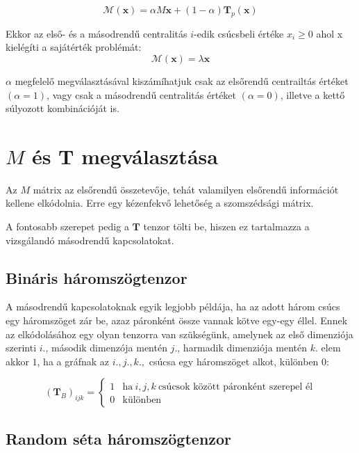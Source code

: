 \documentclass[12pt,numbers=noenddot]{report}
\begin{document}
$$\mathcal{M}(\boldsymbol{x}) = \alpha M \boldsymbol{x} + (1-\alpha) 
\boldsymbol{T}_p(\boldsymbol{x})$$

\noindent
Ekkor az első- és a másodrendű centralitás $i$-edik csúcsbeli értéke $x_i 
\geq 0$ ahol x kielégíti a sajátérték problémát:
$$\mathcal{M}(\boldsymbol{x}) = \lambda \boldsymbol{x}$$

\noindent
$\alpha$ megfelelő megválasztásával kiszámíhatjuk csak az elsőrendű 
centrailtás értéket $(\alpha = 1)$, vagy csak a másodrendű centralitás 
értéket $(\alpha = 0)$, illetve a kettő súlyozott kombinációját is.


\section{$M$ és $\boldsymbol{T}$ megválasztása}

Az $M$ mátrix az elsőrendű összetevője, tehát valamilyen elsőrendű 
információt kellene elkódolnia. 
Erre egy kézenfekvő lehetőség a szomszédsági mátrix.

A fontosabb szerepet pedig a $\boldsymbol{T}$ tenzor tölti be, hiszen ez 
tartalmazza a vizsgálandó másodrendű kapcsolatokat.

\subsection*{Bináris háromszögtenzor}

A másodrendű kapcsolatoknak egyik legjobb példája, ha az adott három csúcs egy
háromszöget zár be, azaz páronként össze vannak kötve egy-egy éllel.
Ennek az elkódolásához egy olyan tenzorra van szükségünk, amelynek az első 
dimenziója szerinti $i.$, második dimenzója mentén $j.$, harmadik dimenziója
mentén $k.$ elem akkor $1$, ha a gráfnak az $i., j., k.,$ csúcsa egy háromszöget
alkot, különben $0$:

\begin{equation}
	(\boldsymbol{T}_B)_{ijk} = 
		\begin{cases}
			1 & \text{ha} ~ i, j, k ~ \text{csúcsok között páronként szerepel él} \\
			0 & \text{különben}
		\end{cases}
\end{equation}

\pagebreak

\subsection*{Random séta háromszögtenzor}
\end{document}
